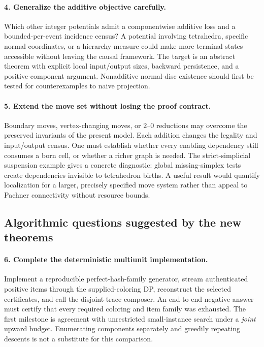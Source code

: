 \paragraph{4. Generalize the additive objective carefully.}
Which other integer potentials admit a componentwise additive loss and a
bounded-per-event incidence census? A potential involving tetrahedra,
specific normal coordinates, or a hierarchy measure could make more
terminal states accessible without leaving the causal framework. The
target is an abstract theorem with explicit local input/output sizes,
backward persistence, and a positive-component argument. Nonadditive
normal-disc existence should first be tested for counterexamples to naive
projection.

\paragraph{5. Extend the move set without losing the proof contract.}
Boundary moves, vertex-changing moves, or $2$--$0$ reductions may overcome
the preserved invariants of the present model. Each addition changes the
legality and input/output census. One must establish whether every enabling
dependency still consumes a born cell, or whether a richer graph is needed.
The strict-simplicial suspension example gives a concrete diagnostic:
global missing-simplex tests create dependencies invisible to tetrahedron
births. A useful result would quantify localization for a larger,
precisely specified move system rather than appeal to Pachner connectivity
without resource bounds.

\subsection{Algorithmic questions suggested by the new theorems}

\paragraph{6. Complete the deterministic multiunit implementation.}
Implement a reproducible perfect-hash-family generator, stream authenticated
positive items through the supplied-coloring DP, reconstruct the selected
certificates, and call the disjoint-trace composer. An end-to-end negative
answer must certify that every required coloring and item family was
exhausted. The first milestone is agreement with unrestricted small-instance
search under a \emph{joint} upward budget. Enumerating components separately
and greedily repeating descents is not a substitute for this comparison.

